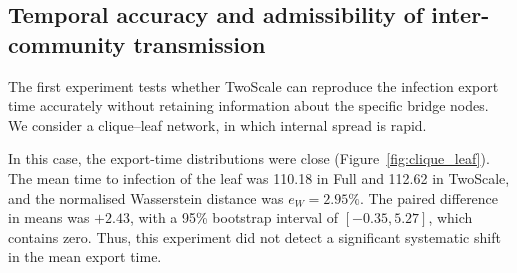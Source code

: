 \documentclass{ieeeaccess}
\newcommand{\Full}{\textup{Full}}
\newcommand{\TS}{\textup{TwoScale}}
\newcommand{\eW}{e_{W}}
\begin{document}
\subsection{Temporal accuracy and admissibility of inter-community transmission}
\label{sec:res_clique}

The first experiment tests whether \TS{} can reproduce the infection export time accurately without retaining information about the specific bridge nodes. We consider a clique--leaf network, in which internal spread is rapid.

In this case, the export-time distributions were close (Figure~\ref{fig:clique_leaf}). The mean time to infection of the leaf was 110.18 in \Full{} and 112.62 in \TS{}, and the normalised Wasserstein distance was $\eW=2.95\%$. The paired difference in means was $+2.43$, with a 95\% bootstrap interval of $[-0.35,5.27]$, which contains zero. Thus, this experiment did not detect a significant systematic shift in the mean export time.
\end{document}
